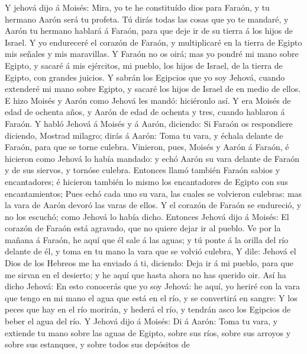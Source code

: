  Y jehová dijo á Moisés: Mira, yo te he constituído dios
para Faraón, y tu hermano Aarón será tu profeta.  Tú dirás
todas las cosas que yo te mandaré, y Aarón tu hermano hablará á Faraón,
para que deje ir de su tierra á los hijos de Israel.  Y yo
endureceré el corazón de Faraón, y multiplicaré en la tierra de Egipto
mis señales y mis maravillas.  Y Faraón no os oirá; mas yo
pondré mi mano sobre Egipto, y sacaré á mis ejércitos, mi pueblo, los
hijos de Israel, de la tierra de Egipto, con grandes juicios.
 Y sabrán los Egipcios que yo soy Jehová, cuando extenderé
mi mano sobre Egipto, y sacaré los hijos de Israel de en medio de ellos.
 E hizo Moisés y Aarón como Jehová les mandó: hiciéronlo
así.  Y era Moisés de edad de ochenta años, y Aarón de edad
de ochenta y tres, cuando hablaron á Faraón.  Y habló Jehová
á Moisés y á Aarón, diciendo:  Si Faraón os respondiere
diciendo, Mostrad milagro; dirás á Aarón: Toma tu vara, y échala delante
de Faraón, para que se torne culebra.  Vinieron, pues,
Moisés y Aarón á Faraón, é hicieron como Jehová lo había mandado: y echó
Aarón su vara delante de Faraón y de sus siervos, y tornóse culebra.
 Entonces llamó también Faraón sabios y encantadores; é
hicieron también lo mismo los encantadores de Egipto con sus
encantamientos;  Pues echó cada uno su vara, las cuales se
volvieron culebras: mas la vara de Aarón devoró las varas de ellos.
 Y el corazón de Faraón se endureció, y no los escuchó;
como Jehová lo había dicho.  Entonces Jehová dijo á Moisés:
El corazón de Faraón está agravado, que no quiere dejar ir al pueblo.
 Ve por la mañana á Faraón, he aquí que él sale á las
aguas; y tú ponte á la orilla del río delante de él, y toma en tu mano
la vara que se volvió culebra,  Y dile: Jehová el Dios de
los Hebreos me ha enviado á ti, diciendo: Deja ir á mi pueblo, para que
me sirvan en el desierto; y he aquí que hasta ahora no has querido oir.
 Así ha dicho Jehová: En esto conocerás que yo soy Jehová:
he aquí, yo heriré con la vara que tengo en mi mano el agua que está en
el río, y se convertirá en sangre:  Y los peces que hay en
el río morirán, y hederá el río, y tendrán asco los Egipcios de beber el
agua del río.  Y Jehová dijo á Moisés: Di á Aarón: Toma tu
vara, y extiende tu mano sobre las aguas de Egipto, sobre sus ríos,
sobre sus arroyos y sobre sus estanques, y sobre todos sus depósitos de
